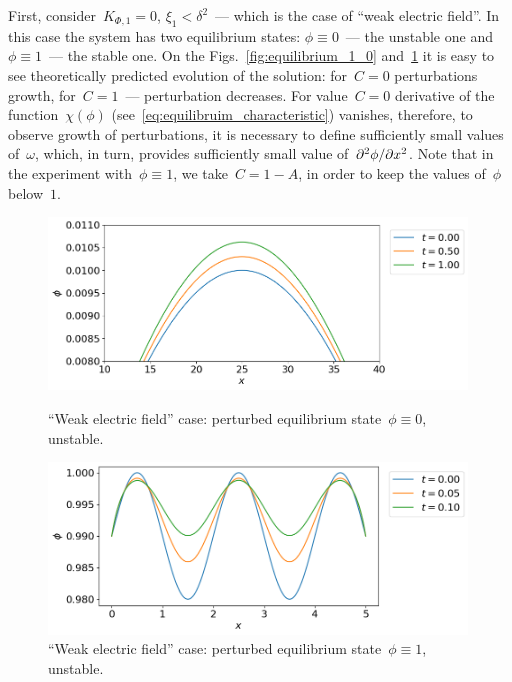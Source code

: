 First, consider~$K_{\Phi, 1} = 0$, $\xi_1 < \delta^2$~---
which is the case of ``weak electric field''.
In this case the system has two equilibrium states:
$\phi \equiv 0$~--- the unstable one and~$\phi \equiv 1$~--- the
stable one.
On the Figs.~\ref{fig:equilibrium_1_0} and~\ref{fig:equilibrium_1_1}
it is easy to see theoretically predicted evolution of the solution:
for~$C = 0$ perturbations  growth, for~$C = 1$~--- perturbation
decreases.
For value~$C = 0$ derivative of the function~$\chi(\phi)$
(see~\eqref{eq:equilibruim_characteristic}) vanishes, therefore,
to observe growth of perturbations, it is necessary to define
sufficiently small values of~$\omega$,
which, in turn, provides sufficiently small
value of~$\partial^2 \phi / \partial x^2$.
Note that in the experiment with~$\phi \equiv 1$,
we take~$C = 1 - A$, in order to keep the values of~$\phi$ below~$1$.

\begin{figure}[!t]
	\centering
	\includegraphics[width=0.99\textwidth]{figures/equilibrium_1_0.png}
	\vspace{-0.3cm}
	\caption{``Weak electric field'' case: perturbed equilibrium state~$\phi \equiv 0$, unstable.}
	\label{fig:equilibrium_1_0}
	\vspace{0.5cm}
	
	\includegraphics[width=0.99\textwidth]{figures/equilibrium_1_1.png}
	\vspace{-0.3cm}
	\caption{``Weak electric field'' case: perturbed equilibrium state~$\phi \equiv 1$, unstable.}
	\label{fig:equilibrium_1_1}
\end{figure}

